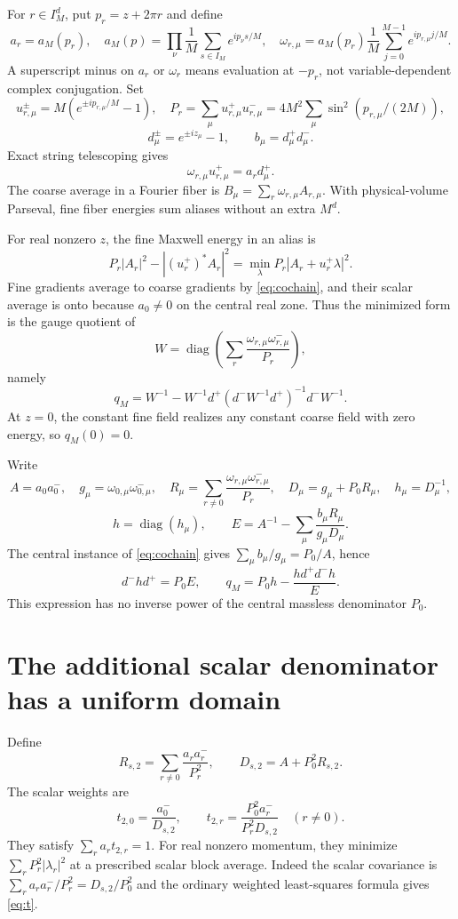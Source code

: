 \documentclass[11pt]{article}
\theoremstyle{remark}
\newcommand{\diag}{\operatorname{diag}}
\begin{document}
For $r\in I_M^d$, put $p_r=z+2\pi r$ and define
\[
 a_r=a_M(p_r),\quad
 a_M(p)=\prod_\nu\frac1M\sum_{s\in I_M}e^{ip_\nu s/M},
 \quad
 \omega_{r,\mu}=a_M(p_r)\frac1M\sum_{j=0}^{M-1}e^{ip_{r,\mu}j/M}.
\]
A superscript minus on $a_r$ or $\omega_r$ means evaluation at
$-p_r$, not variable-dependent complex conjugation. Set
\[
 u_{r,\mu}^{\pm}=M(e^{\pm ip_{r,\mu}/M}-1),\quad
 P_r=\sum_\mu u_{r,\mu}^+u_{r,\mu}^-
     =4M^2\sum_\mu\sin^2(p_{r,\mu}/(2M)),
\]
\[
 d_\mu^\pm=e^{\pm iz_\mu}-1,\qquad b_\mu=d_\mu^+d_\mu^-.
\]
Exact string telescoping gives
\begin{equation}\label{eq:cochain}
 \omega_{r,\mu}u_{r,\mu}^+=a_r d_\mu^+.
\end{equation}
The coarse average in a Fourier fiber is
$B_\mu=\sum_r\omega_{r,\mu}A_{r,\mu}$. With physical-volume
Parseval, fine fiber energies sum aliases without an extra $M^d$.

For real nonzero $z$, the fine Maxwell energy in an alias is
\[
 P_r|A_r|^2-|(u_r^+)^*A_r|^2
       =\min_\lambda P_r|A_r+u_r^+\lambda|^2.
\]
Fine gradients average to coarse gradients by \eqref{eq:cochain},
and their scalar average is onto because $a_0\ne0$ on the central
real zone. Thus the minimized form is the gauge quotient of
\[
 W=\diag\left(\sum_r\frac{\omega_{r,\mu}\omega_{r,\mu}^-}{P_r}\right),
\]
namely
\[
 q_M=W^{-1}-W^{-1}d^+(d^-W^{-1}d^+)^{-1}d^-W^{-1}.
\]
At $z=0$, the constant fine field realizes any constant coarse field
with zero energy, so $q_M(0)=0$.

Write
\[
 A=a_0a_0^-,\quad g_\mu=\omega_{0,\mu}\omega_{0,\mu}^-,\quad
 R_\mu=\sum_{r\ne0}\frac{\omega_{r,\mu}\omega_{r,\mu}^-}{P_r},
 \quad D_\mu=g_\mu+P_0R_\mu,\quad h_\mu=D_\mu^{-1},
\]
\[
 h=\diag(h_\mu),\qquad
 E=A^{-1}-\sum_\mu\frac{b_\mu R_\mu}{g_\mu D_\mu}.
\]
The central instance of \eqref{eq:cochain} gives
$\sum_\mu b_\mu/g_\mu=P_0/A$, hence
\begin{equation}\label{eq:q}
 d^-hd^+=P_0E,\qquad
 q_M=P_0h-\frac{hd^+d^-h}{E}.
\end{equation}
This expression has no inverse power of the central massless
denominator $P_0$.

\section{The additional scalar denominator has a uniform domain}

Define
\begin{equation}\label{eq:scalar-two}
 R_{s,2}=\sum_{r\ne0}\frac{a_ra_r^-}{P_r^2},\qquad
 D_{s,2}=A+P_0^2R_{s,2}.
\end{equation}
The scalar weights are
\begin{equation}\label{eq:t}
 t_{2,0}=\frac{a_0^-}{D_{s,2}},\qquad
 t_{2,r}=\frac{P_0^2a_r^-}{P_r^2D_{s,2}}\quad(r\ne0).
\end{equation}
They satisfy $\sum_r a_rt_{2,r}=1$. For real nonzero momentum,
they minimize $\sum_rP_r^2|\lambda_r|^2$ at a prescribed scalar
block average. Indeed the scalar covariance is
$\sum_r a_ra_r^-/P_r^2=D_{s,2}/P_0^2$ and the ordinary weighted
least-squares formula gives \eqref{eq:t}.
\end{document}
